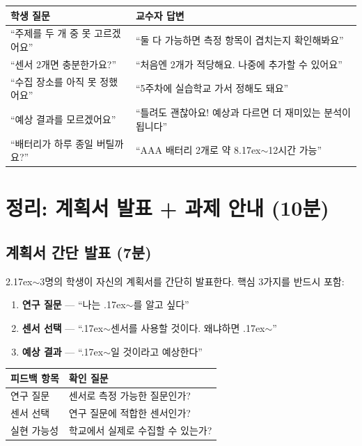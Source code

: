 \documentclass[11pt, a4paper]{article}
\begin{document}
\begin{center}
\small
\begin{tabularx}{\textwidth}{L{4.8cm}X}
\toprule
\textbf{학생 질문} & \textbf{교수자 답변} \\
\midrule
``주제를 두 개 중 못 고르겠어요'' & ``둘 다 가능하면 측정 항목이 겹치는지 확인해봐요'' \\
``센서 2개면 충분한가요?'' & ``처음엔 2개가 적당해요. 나중에 추가할 수 있어요'' \\
``수집 장소를 아직 못 정했어요'' & ``5주차에 실습학교 가서 정해도 돼요'' \\
``예상 결과를 모르겠어요'' & ``틀려도 괜찮아요! 예상과 다르면 더 재미있는 분석이 됩니다'' \\
``배터리가 하루 종일 버틸까요?'' & ``AAA 배터리 2개로 약 8{\raise.17ex\hbox{$\scriptstyle\sim$}}12시간 가능'' \\
\bottomrule
\end{tabularx}
\end{center}

\section{정리: 계획서 발표 + 과제 안내 (10분)}

\subsection{계획서 간단 발표 (7분)}

2{\raise.17ex\hbox{$\scriptstyle\sim$}}3명의 학생이 자신의 계획서를 간단히 발표한다. 핵심 3가지를 반드시 포함:

\begin{enumerate}[nosep]
  \item \textbf{연구 질문} --- ``나는 {\raise.17ex\hbox{$\scriptstyle\sim$}}를 알고 싶다''
  \item \textbf{센서 선택} --- ``{\raise.17ex\hbox{$\scriptstyle\sim$}}센서를 사용할 것이다. 왜냐하면 {\raise.17ex\hbox{$\scriptstyle\sim$}}''
  \item \textbf{예상 결과} --- ``{\raise.17ex\hbox{$\scriptstyle\sim$}}일 것이라고 예상한다''
\end{enumerate}

\begin{center}
\begin{tabularx}{0.85\textwidth}{L{3cm}X}
\toprule
\textbf{피드백 항목} & \textbf{확인 질문} \\
\midrule
연구 질문 & 센서로 측정 가능한 질문인가? \\
센서 선택 & 연구 질문에 적합한 센서인가? \\
실현 가능성 & 학교에서 실제로 수집할 수 있는가? \\
\bottomrule
\end{tabularx}
\end{center}
\end{document}

